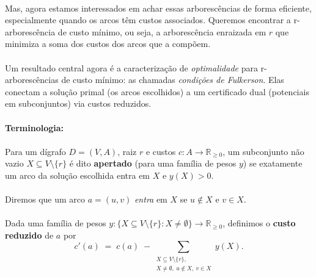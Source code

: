\documentclass[12pt,a4paper]{article}
\begin{document}
\paragraph{}
Mas, agora estamos interessados em achar essas arborescências de forma eficiente, especialmente quando os arcos têm custos associados. Queremos encontrar a r-arborescência de custo mínimo, ou seja, a arborescência enraizada em \(r\) que minimiza a soma dos custos dos arcos que a compõem.

\paragraph{}
Um resultado central agora é a caracterização de \emph{optimalidade} para r-arborescências de custo mínimo: as chamadas \emph{condições de Fulkerson}. Elas conectam a solução primal (os arcos escolhidos) a um certificado dual (potenciais em subconjuntos) via custos reduzidos.

\paragraph{Terminologia:} 
\paragraph{}
Para um dígrafo $D=(V,A)$, raiz $r$ e custos $c:A\to \mathbb{R}_{\ge 0}$, um subconjunto não vazio $X\subseteq V\setminus\{r\}$ é dito \textbf{apertado} (para uma família de pesos $y$) se exatamente um arco da solução escolhida entra em $X$ e $y(X)>0$. 

\paragraph{}
Diremos que um arco $a=(u,v)$ \emph{entra} em $X$ se $u\notin X$ e $v\in X$. 

\paragraph{}
Dada uma família de pesos $y: \{X\subseteq V\setminus\{r\}: X\neq\emptyset\}\to \mathbb{R}_{\ge 0}$, definimos o \textbf{custo reduzido} de $a$ por
\[
 c'(a) \;=\; c(a)\; - \sum_{\substack{X\subseteq V\setminus\{r\},\\ X\neq\emptyset,\ u\notin X,\ v\in X}} y(X).
\]
\end{document}
